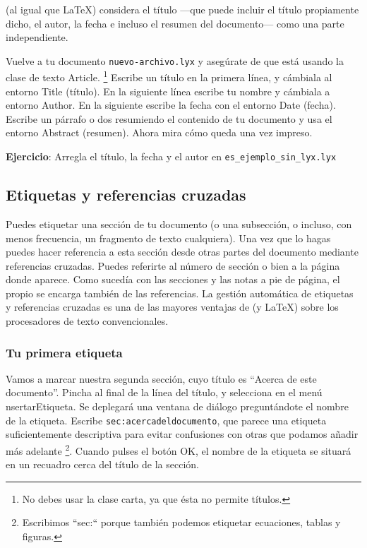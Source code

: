 \LyX{} (al igual que \LaTeX{}) considera el título ---que puede incluir
el título propiamente dicho, el autor, la fecha e incluso el resumen
del documento--- como una parte independiente.

Vuelve a tu documento \texttt{nuevo-archivo.lyx} y asegúrate de que
está usando la clase de texto \textsf{Article}.%
\footnote{No debes usar la clase carta, ya que ésta no permite títulos.%
} Escribe un título en la primera línea, y cámbiala al entorno \textsf{Title}
(título). En la siguiente línea escribe tu nombre y cámbiala a entorno
\textsf{Author.} En la siguiente escribe la fecha con el entorno \textsf{Date}
(fecha). Escribe un párrafo o dos resumiendo el contenido de tu documento
y usa el entorno \textsf{Abstract} (resumen). Ahora mira cómo queda
una vez impreso.

\textbf{Ejercicio}: Arregla el título, la fecha y el autor en \texttt{es\_ejemplo\_sin\_lyx.lyx}


\subsection{Etiquetas y referencias cruzadas}

\label{sec:labels}Puedes etiquetar una sección de tu documento (o
una subsección, o incluso, con menos frecuencia, un fragmento de texto
cualquiera). Una vez que lo hagas puedes hacer referencia a esta sección
desde otras partes del documento mediante referencias cruzadas. Puedes
referirte al número de sección o bien a la página donde aparece. Como
sucedía con las secciones y las notas a pie de página, el propio \LyX{}
se encarga también de las referencias. La gestión automática de etiquetas
y referencias cruzadas es una de las mayores ventajas de \LyX{} (y
\LaTeX{}) sobre los procesadores de texto convencionales.


\subsubsection*{Tu primera etiqueta}

Vamos a marcar nuestra segunda sección, cuyo título es {}``Acerca
de este documento''. Pincha al final de la línea del título, y selecciona
en el menú \textsf{}\textsf{nsertar\lyxarrow{}Etiqueta}.
Se deplegará una ventana de diálogo preguntándote el nombre de la
etiqueta. Escribe \texttt{sec:acercadeldocumento}, que parece una
etiqueta suficientemente descriptiva para evitar confusiones con otras
que podamos añadir más adelante%
\footnote{Escribimos {}``sec:{}`` porque también podemos etiquetar ecuaciones,
tablas y figuras.%
}. Cuando pulses el botón \textsf{OK}, el nombre de la etiqueta se
situará en un recuadro cerca del título de la sección.

